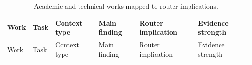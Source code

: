 \documentclass[
  11pt,
  letterpaper,
  numbers=noendperiod,
  parskip=half]{scrartcl}
\begin{document}
\begin{longtable}[]{@{}
  >{\raggedright\arraybackslash}p{}
  >{\raggedright\arraybackslash}p{}
  >{\raggedright\arraybackslash}p{}
  >{\raggedright\arraybackslash}p{}
  >{\raggedright\arraybackslash}p{}
  >{\raggedright\arraybackslash}p{}@{}}
\caption{Academic and technical works mapped to router
implications.}\label{tbl-paper-matrix}\tabularnewline
\toprule\noalign{}
\begin{minipage}[b]{\linewidth}\raggedright
Work
\end{minipage} & \begin{minipage}[b]{\linewidth}\raggedright
Task
\end{minipage} & \begin{minipage}[b]{\linewidth}\raggedright
Context type
\end{minipage} & \begin{minipage}[b]{\linewidth}\raggedright
Main finding
\end{minipage} & \begin{minipage}[b]{\linewidth}\raggedright
Router implication
\end{minipage} & \begin{minipage}[b]{\linewidth}\raggedright
Evidence strength
\end{minipage} \\
\midrule\noalign{}
\endfirsthead
\toprule\noalign{}
\begin{minipage}[b]{\linewidth}\raggedright
Work
\end{minipage} & \begin{minipage}[b]{\linewidth}\raggedright
Task
\end{minipage} & \begin{minipage}[b]{\linewidth}\raggedright
Context type
\end{minipage} & \begin{minipage}[b]{\linewidth}\raggedright
Main finding
\end{minipage} & \begin{minipage}[b]{\linewidth}\raggedright
Router implication
\end{minipage} & \begin{minipage}[b]{\linewidth}\raggedright
Evidence strength
\end{minipage} \\

\end{longtable}
\end{document}
